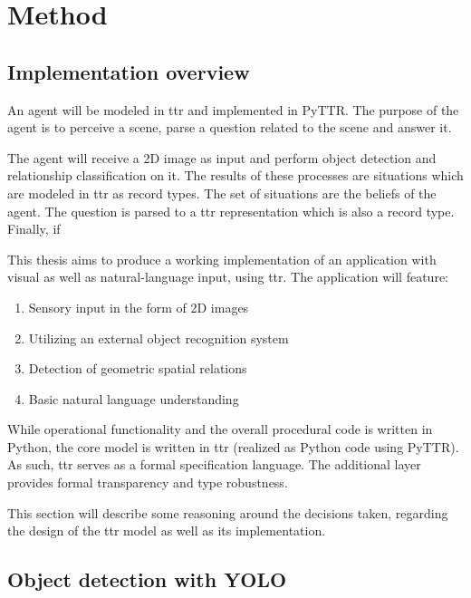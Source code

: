 \section{Method}
\label{sec:method}



\subsection{Implementation overview}
\label{sec:imploverview}

An agent will be modeled in \gls{ttr} and implemented in PyTTR.
The purpose of the agent is to perceive a scene, parse a question related to the scene and answer it.

The agent will receive a 2D image as input and perform object detection and relationship classification on it.
The results of these processes are situations which are modeled in \gls{ttr} as record types.
The set of situations are the beliefs of the agent.
The question is parsed to a \gls{ttr} representation which is also a record type.
Finally, if 


This thesis aims to produce a working implementation of an application with visual as well as natural-language input, using \gls{ttr}.
The application will feature:

\begin{enumerate}
\item Sensory input in the form of 2D images
\item Utilizing an external object recognition system
\item Detection of geometric spatial relations
\item Basic natural language understanding
\end{enumerate}

While operational functionality and the overall procedural code is written in Python, the core model is written in \gls{ttr} (realized as Python code using PyTTR).
As such, \gls{ttr} serves as a formal specification language.
The additional layer provides formal transparency and type robustness.

This section will describe some reasoning around the decisions taken, regarding the design of the \gls{ttr} model as well as its implementation.



\subsection{Object detection with YOLO}

